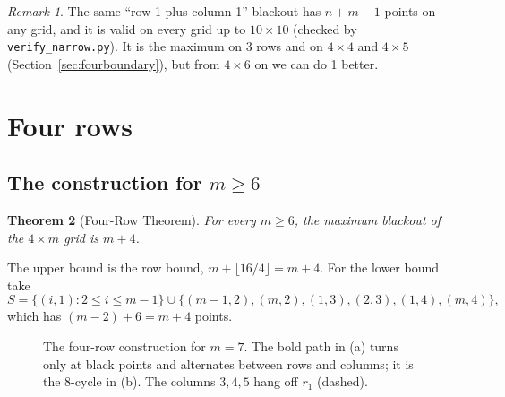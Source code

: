 \documentclass[11pt]{article}
\newtheorem{theorem}{Theorem}[section]
\theoremstyle{definition}
\theoremstyle{remark}
\newtheorem{remark}[theorem]{Remark}
\begin{document}
\begin{remark}
The same ``row 1 plus column 1'' blackout has $n+m-1$ points on any grid, and it is valid on
every grid up to $10\times10$ (checked by \texttt{verify\_narrow.py}). It is the maximum on 3
rows and on $4\times4$ and $4\times5$ (Section~\ref{sec:fourboundary}), but from $4\times6$ on
we can do 1 better.
\end{remark}

\section{Four rows}\label{sec:four}

\subsection{The construction for $m\ge6$}

\begin{theorem}[Four-Row Theorem]\label{thm:fourrow}
For every $m\ge6$, the maximum blackout of the $4\times m$ grid is $m+4$.
\end{theorem}

The upper bound is the row bound, $m+\lfloor16/4\rfloor=m+4$. For the lower bound take
\[
S=\{(i,1):2\le i\le m-1\}\cup\{(m-1,2),(m,2),(1,3),(2,3),(1,4),(m,4)\},
\]
which has $(m-2)+6=m+4$ points.

\begin{figure}[htbp]
\centering

\caption{The four-row construction for $m=7$. The bold path in (a) turns only at black points
and alternates between rows and columns; it is the 8-cycle in (b). The columns $3,4,5$ hang off
$r_1$ (dashed).}
\label{fig:four}
\end{figure}
\end{document}
